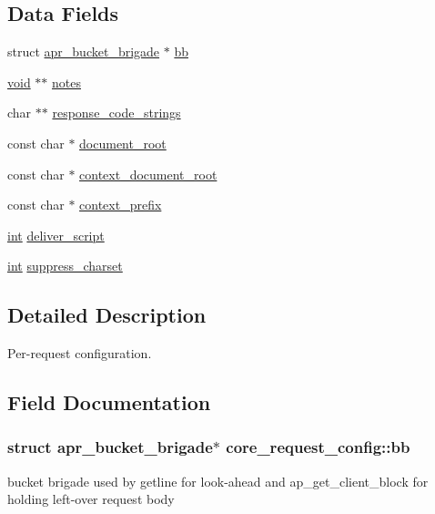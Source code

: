 \subsection*{Data Fields}
\begin{DoxyCompactItemize}
\item 
struct \hyperlink{structapr__bucket__brigade}{apr\+\_\+bucket\+\_\+brigade} $\ast$ \hyperlink{structcore__request__config_ad222565fc8e8fe4ddf14e852711872c6}{bb}
\item 
\hyperlink{group__MOD__ISAPI_gacd6cdbf73df3d9eed42fa493d9b621a6}{void} $\ast$$\ast$ \hyperlink{structcore__request__config_a696e5fbd2cf5a9384e5d92b0877575fd}{notes}
\item 
char $\ast$$\ast$ \hyperlink{structcore__request__config_a12553976ceaa71260fc40cc5d3b41aa5}{response\+\_\+code\+\_\+strings}
\item 
const char $\ast$ \hyperlink{structcore__request__config_a74d54071e954680a7559b33a79fc7b51}{document\+\_\+root}
\item 
const char $\ast$ \hyperlink{structcore__request__config_a8d2ba80a88efece097a10d9f540dc5c8}{context\+\_\+document\+\_\+root}
\item 
const char $\ast$ \hyperlink{structcore__request__config_af42a8ded82353bbb370c476bb3b7404c}{context\+\_\+prefix}
\item 
\hyperlink{pcre_8txt_a42dfa4ff673c82d8efe7144098fbc198}{int} \hyperlink{structcore__request__config_a47a1ab28ea383932931c5782a4780fd1}{deliver\+\_\+script}
\item 
\hyperlink{pcre_8txt_a42dfa4ff673c82d8efe7144098fbc198}{int} \hyperlink{structcore__request__config_a529ca0c5c75d76f20772a0184b816950}{suppress\+\_\+charset}
\end{DoxyCompactItemize}


\subsection{Detailed Description}
Per-\/request configuration. 

\subsection{Field Documentation}
\subsubsection[{\texorpdfstring{bb}{bb}}]{\setlength{\rightskip}{0pt plus 5cm}struct {\bf apr\+\_\+bucket\+\_\+brigade}$\ast$ core\+\_\+request\+\_\+config\+::bb}\hypertarget{structcore__request__config_ad222565fc8e8fe4ddf14e852711872c6}{}\label{structcore__request__config_ad222565fc8e8fe4ddf14e852711872c6}
bucket brigade used by getline for look-\/ahead and ap\+\_\+get\+\_\+client\+\_\+block for holding left-\/over request body 
